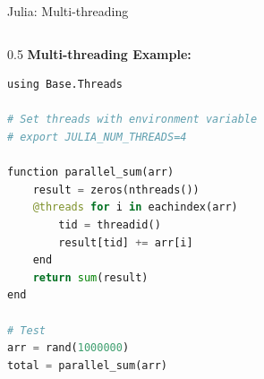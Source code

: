 \documentclass[aspectratio=169,xcolor={dvipsnames}]{beamer}
\newif\ifpresentationmode
\newcommand{\bluroverlay}{%
  \ifpresentationmode
    \begin{tikzpicture}[remember picture, overlay]
      \fill[white, opacity=0.85]
        ([yshift=-1.3cm]current page.north west) rectangle (current page.south east);
      \node[opacity=0.5] at (current page.center) {\Large\textit{Available in extended version}};
    \end{tikzpicture}
  \fi
}
\begin{document}
\begin{frame}[fragile]{Julia: Multi-threading}
    \small
    \begin{columns}[T]
        \begin{column}{0.5\textwidth}
            \textbf{Multi-threading Example:}
            \begin{lstlisting}[language=Python, basicstyle=\tiny\ttfamily]
using Base.Threads

# Set threads with environment variable
# export JULIA_NUM_THREADS=4

function parallel_sum(arr)
    result = zeros(nthreads())
    @threads for i in eachindex(arr)
        tid = threadid()
        result[tid] += arr[i]
    end
    return sum(result)
end

# Test
arr = rand(1000000)
total = parallel_sum(arr)
            \end{lstlisting}
        \end{column}
    \end{columns}
    \bluroverlay
\end{frame}
\end{document}
